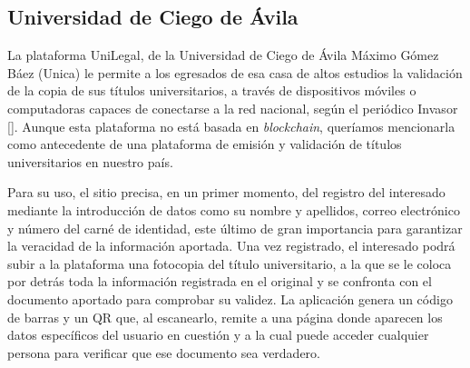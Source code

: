 
\subsection{Universidad de Ciego de Ávila}
La plataforma UniLegal, de la Universidad de Ciego de Ávila Máximo Gómez Báez (Unica) le permite a los egresados de esa casa de altos estudios la validación de la copia de sus títulos universitarios, a través de dispositivos móviles o computadoras capaces de conectarse a la red nacional, según el periódico Invasor [\cite{90}]. Aunque esta plataforma no está basada en \textit{blockchain}, queríamos mencionarla como antecedente de una plataforma de emisión y validación de títulos universitarios en nuestro país.

Para su uso, el sitio precisa, en un primer momento, del registro del interesado mediante la introducción de datos como su nombre y apellidos, correo electrónico y número del carné de identidad, este último de gran importancia para garantizar la veracidad de la información aportada. Una vez registrado, el interesado podrá subir a la plataforma una fotocopia del título universitario, a la que se le coloca por detrás toda la información registrada en el original y se confronta con el documento aportado para comprobar su validez. La aplicación genera un código de barras y un QR que, al escanearlo, remite a una página donde aparecen los datos específicos del usuario en cuestión y a la cual puede acceder cualquier persona para verificar que ese documento sea verdadero.




